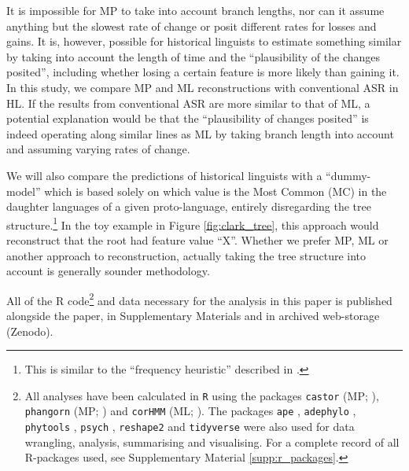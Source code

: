 \documentclass[12pt,letterpaper]{article}
\begin{document}
It is impossible for MP to take into account branch lengths, nor can it assume anything but the slowest rate of change or posit different rates for losses and gains. It is, however, possible for historical linguists to estimate something similar by taking into account the length of time and the ``plausibility of the changes posited'', including whether losing a certain feature is more likely than gaining it. In this study, we compare MP and ML reconstructions with conventional ASR in HL. If the results from conventional ASR are more similar to that of ML, a potential explanation would be that the ``plausibility of changes posited'' is indeed operating along similar lines as ML by taking branch length into account and assuming varying rates of change.

We will also compare the predictions of historical linguists with a ``dummy-model'' which is based solely on which value is the Most Common (MC) in the daughter languages of a given proto-language, entirely disregarding the tree structure.\footnote{This is similar to the ``frequency heuristic'' described in \citet{goldstein_2022}.} In the toy example in Figure \ref{fig:clark_tree}, this approach would reconstruct that the root had feature value ``X''. Whether we prefer MP, ML or another approach to reconstruction, actually taking the tree structure into account is generally sounder methodology. %


All of the R code\footnote{All analyses have been calculated in \texttt{R} \citep{R} using the packages \texttt{castor} (MP; \citet{louca2017efficient}), \texttt{phangorn} (MP; \citealt{phangorn}) and \texttt{corHMM} (ML; \citealt{R-corHMM}). The packages \texttt{ape} \citep{paradis2004ape}, \texttt{adephylo} \citep{jombart2017package}, \texttt{phytools} \citep{revell2012phytools}, \texttt{psych} \citep{psych_r_package},  \texttt{reshape2} \citep{wickham2020reshape2} and \texttt{tidyverse} \citep{tidyverse13} were also used for data wrangling, analysis, summarising and visualising. For a complete record of all R-packages used, see Supplementary Material \ref{supp:r_packages}.} and data necessary for the analysis in this paper is published alongside the paper, in Supplementary Materials and in archived web-storage (Zenodo).
\end{document}
